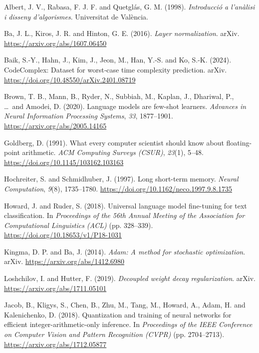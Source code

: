 \documentclass[12pt,twoside]{article}
\begin{document}
\begin{thebibliography}{100}




 Albert, J. V., Rabasa, F. J. F. and Quetglás, G. M. (1998). \textit{Introducció a l’anàlisi i disseny d’algorismes}. Universitat de València.

 Ba, J. L., Kiros, J. R. and Hinton, G. E. (2016). \textit{Layer normalization}. arXiv. \url{https://arxiv.org/abs/1607.06450}

 Baik, S.-Y., Hahn, J., Kim, J., Jeon, M., Han, Y.-S. and Ko, S.-K. (2024). CodeComplex: Dataset for worst‑case time complexity prediction. arXiv. \url{https://doi.org/10.48550/arXiv.2401.08719}

 Brown, T. B., Mann, B., Ryder, N., Subbiah, M., Kaplan, J., Dhariwal, P., \ldots\ and Amodei, D. (2020). Language models are few-shot learners. \textit{Advances in Neural Information Processing Systems}, \textit{33}, 1877--1901. \url{https://arxiv.org/abs/2005.14165}

 Goldberg, D. (1991). What every computer scientist should know about floating-point arithmetic. \textit{ACM Computing Surveys (CSUR)}, \textit{23}(1), 5--48. \url{https://doi.org/10.1145/103162.103163}

 Hochreiter, S. and Schmidhuber, J. (1997). Long short-term memory. \textit{Neural Computation}, \textit{9}(8), 1735--1780. \url{https://doi.org/10.1162/neco.1997.9.8.1735}

 Howard, J. and Ruder, S. (2018). Universal language model fine-tuning for text classification. In \textit{Proceedings of the 56th Annual Meeting of the Association for Computational Linguistics (ACL)} (pp. 328--339). \url{https://doi.org/10.18653/v1/P18-1031}

 Kingma, D. P. and Ba, J. (2014). \textit{Adam: A method for stochastic optimization}. arXiv. \url{https://arxiv.org/abs/1412.6980}

 Loshchilov, I. and Hutter, F. (2019). \textit{Decoupled weight decay regularization}. arXiv. \url{https://arxiv.org/abs/1711.05101}

 Jacob, B., Kligys, S., Chen, B., Zhu, M., Tang, M., Howard, A., Adam, H. and Kalenichenko, D. (2018). Quantization and training of neural networks for efficient integer-arithmetic-only inference. In \textit{Proceedings of the IEEE Conference on Computer Vision and Pattern Recognition (CVPR)} (pp. 2704--2713). \url{https://arxiv.org/abs/1712.05877}


\end{thebibliography}
\end{document}
